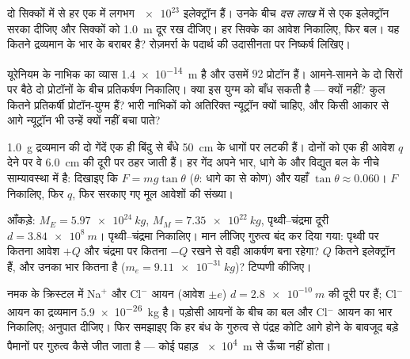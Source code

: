 \begin{exercise}[$\star\star$]\label{exo:g11:fundamental-interactions:11}
दो सिक्कों में से हर एक में लगभग $\num{e23}$ इलेक्ट्रॉन हैं। उनके बीच
\emph{दस लाख} में से एक इलेक्ट्रॉन सरका दीजिए और सिक्कों को \qty{1.0}{m} दूर रख
दीजिए। हर सिक्के का आवेश निकालिए, फिर बल। यह कितने द्रव्यमान के
भार के बराबर है? रोज़मर्रा के पदार्थ की उदासीनता पर निष्कर्ष
लिखिए।
\end{exercise}

\begin{exercise}[$\star\star\star$]\label{exo:g11:fundamental-interactions:12}
यूरेनियम के नाभिक का व्यास \qty{1.4e-14}{m} है और उसमें $92$ प्रोटॉन हैं।
आमने-सामने के दो सिरों पर बैठे दो प्रोटॉनों के बीच प्रतिकर्षण निकालिए। क्या
 इस युग्म को बाँध सकती है --- क्यों नहीं? कुल कितने
प्रतिकर्षी प्रोटॉन-युग्म हैं? भारी नाभिकों को अतिरिक्त न्यूट्रॉन क्यों चाहिए,
और किसी आकार से आगे न्यूट्रॉन भी उन्हें क्यों नहीं बचा पाते?
\end{exercise}

\begin{exercise}[$\star\star\star$]\label{exo:g11:fundamental-interactions:13}
\qty{1.0}{g} द्रव्यमान की दो गेंदें एक ही बिंदु से बँधे \qty{50}{cm} के धागों पर लटकी
हैं। दोनों को एक ही आवेश $q$ देने पर वे \qty{6.0}{cm} की दूरी पर ठहर जाती हैं।
हर गेंद अपने भार, धागे के  और विद्युत बल के
नीचे साम्यावस्था में है: दिखाइए कि $F = mg\tan\theta$ ($\theta$: धागे का  से
कोण) और यहाँ $\tan\theta \approx 0.060$। $F$ निकालिए, फिर $q$, फिर सरकाए गए
मूल आवेशों की संख्या।
\end{exercise}

\begin{exercise}[$\star\star\star$]\label{exo:g11:fundamental-interactions:14}
आँकड़े: $M_E = \qty{5.97e24}{kg}$, $M_M = \qty{7.35e22}{kg}$, पृथ्वी--चंद्रमा दूरी $d = \qty{3.84e8}{m}$। पृथ्वी--चंद्रमा
 निकालिए। मान लीजिए गुरुत्व बंद कर दिया गया: पृथ्वी
पर कितना आवेश $+Q$ और चंद्रमा पर कितना $-Q$ रखने से वही आकर्षण बना
रहेगा? $Q$ कितने इलेक्ट्रॉन हैं, और उनका भार कितना है ($m_e = \qty{9.11e-31}{kg}$)? टिप्पणी
कीजिए।
\end{exercise}

\begin{exercise}[$\star\star\star$]\label{exo:g11:fundamental-interactions:15}
नमक के क्रिस्टल में Na$^{+}$ और Cl$^{-}$ आयन (आवेश $\pm e$) $d = \qty{2.8e-10}{m}$ की
दूरी पर हैं; Cl$^{-}$ आयन का द्रव्यमान \qty{5.9e-26}{kg} है। पड़ोसी आयनों के बीच का
बल और Cl$^{-}$ आयन का भार निकालिए; अनुपात दीजिए। फिर
समझाइए कि हर बंध के गुरुत्व से पंद्रह कोटि आगे होने के बावजूद बड़े पैमानों पर
गुरुत्व कैसे जीत जाता है --- कोई पहाड़ \qty{e4}{m} से ऊँचा नहीं होता।
\end{exercise}

